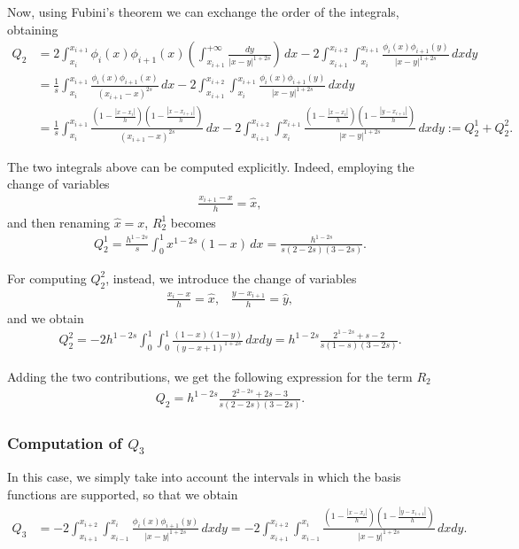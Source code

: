 {Now, using Fubini's theorem we can exchange the order of the integrals, obtaining 
\begin{align*}
	Q_2 &= 2\int_{x_i}^{x_{i+1}}\phi_i(x)\phi_{i+1}(x)\left(\int_{x_{i+1}}^{+\infty} \frac{dy}{|x-y|^{1+2s}}\right)\,dx - 2\int_{x_{i+1}}^{x_{i+2}}\int_{x_i}^{x_{i+1}} \frac{\phi_i(x)\phi_{i+1}(y)}{|x-y|^{1+2s}}\,dxdy 
	\\
	&= \frac{1}{s}\int_{x_i}^{x_{i+1}}\frac{\phi_i(x)\phi_{i+1}(x)}{(x_{i+1}-x)^{2s}}\,dx - 2\int_{x_{i+1}}^{x_{i+2}}\int_{x_i}^{x_{i+1}} \frac{\phi_i(x)\phi_{i+1}(y)}{|x-y|^{1+2s}}\,dxdy
	\\
	&= \frac{1}{s}\int_{x_i}^{x_{i+1}}\frac{\left(1-\frac{|x-x_i|}{h}\right)\left(1-\frac{|x-x_{i+1}|}{h}\right)}{(x_{i+1}-x)^{2s}}\,dx - 2\int_{x_{i+1}}^{x_{i+2}}\int_{x_i}^{x_{i+1}} \frac{\left(1-\frac{|x-x_i|}{h}\right)\left(1-\frac{|y-x_{i+1}|}{h}\right)}{|x-y|^{1+2s}}\,dxdy:= Q_2^1 + Q_2^2.
\end{align*}

The two integrals above can be computed explicitly. Indeed, employing the change of variables
\begin{align*}
	\frac{x_{i+1}-x}{h}=\hat{x},
\end{align*}
and then renaming $\hat{x}=x$, $R_2^1$ becomes
\begin{align*}
	Q_2^1=\frac{h^{1-2s}}{s}\int_0^1 x^{1-2s}(1-x)\,dx = \frac{h^{1-2s}}{s(2-2s)(3-2s)}.
\end{align*}

For computing $Q_2^2$, instead, we introduce the change of variables
\begin{align}\label{cv3}
	\frac{x_i-x}{h}=\hat{x},\;\;\;\frac{y-x_{i+1}}{h}=\hat{y},
\end{align}
and we obtain
\begin{align*}
	Q_2^2 = -2h^{1-2s}\int_0^1\int_0^1\frac{(1-x)(1-y)}{(y-x+1)^{1+2s}}\,dxdy = h^{1-2s}\frac{2^{1-2s}+s-2}{s(1-s)(3-2s)}.
\end{align*}

Adding the two contributions, we get the following expression for the term $R_2$
\begin{align*}
	Q_2 = h^{1-2s}\frac{2^{2-2s}+2s-3}{s(2-2s)(3-2s)}.
\end{align*}

\subsubsection*{Computation of $Q_3$}
In this case, we simply take into account the intervals in which the basis functions are supported, so that we obtain
\begin{align*}
	Q_3 &= -2\int_{x_{i+1}}^{x_{i+2}}\int_{x_{i-1}}^{x_i} \frac{\phi_i(x)\phi_{i+1}(y)}{|x-y|^{1+2s}}\,dxdy = - 2\int_{x_{i+1}}^{x_{i+2}}\int_{x_{i-1}}^{x_i} \frac{\left(1-\frac{|x-x_i|}{h}\right)\left(1-\frac{|y-x_{i+1}|}{h}\right)}{|x-y|^{1+2s}}\,dxdy.
\end{align*}

}

